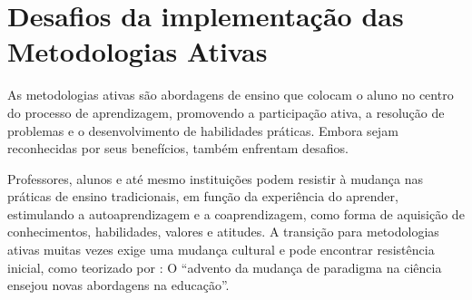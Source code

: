 \section{Desafios da implementação das Metodologias Ativas} \label{sec:2.3_DesafiosMetAtiv}

As metodologias ativas são abordagens de ensino que colocam o aluno no centro do processo de aprendizagem, promovendo a participação ativa, a resolução de problemas e o desenvolvimento de habilidades práticas. Embora sejam reconhecidas por seus benefícios, também enfrentam desafios.

Professores, alunos e até mesmo instituições podem resistir à mudança nas práticas de ensino tradicionais, em função da experiência do aprender, estimulando a autoaprendizagem e a coaprendizagem, como forma de aquisição de conhecimentos, habilidades, valores e atitudes.  A transição para metodologias ativas muitas vezes exige uma mudança cultural e pode encontrar resistência inicial, como teorizado por : O ``advento da mudança de paradigma na ciência ensejou novas abordagens na educação''.

